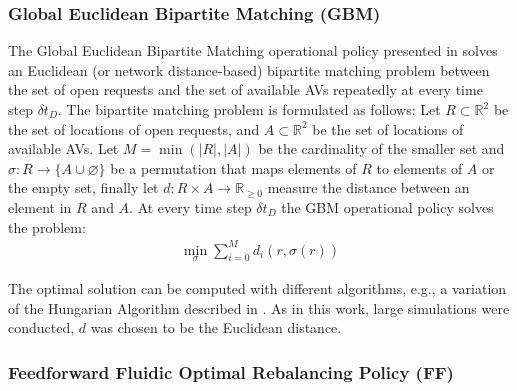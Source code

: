 \subsubsection{Global Euclidean Bipartite Matching (GBM)}

The Global Euclidean Bipartite Matching operational policy presented in \citep{amodeusBase} solves an  Euclidean (or network distance-based) bipartite matching problem between the set of open requests and the set of available AVs repeatedly at every time step $\delta t_D$. The bipartite matching problem is formulated as follows: Let $R\subset \mathbb{R}^2 $ be the set of locations of open requests, and $A\subset \mathbb{R}^2 $ be the set of locations of available AVs. Let $M=\min(|R|,|A|)$ be the cardinality of the smaller set and $\sigma: R \to \{A \cup \varnothing \}$ be a permutation that maps elements of $R$ to elements of $A$ or the empty set, finally let $d: R \times A \to \mathbb{R}_{\geq 0}$ measure the distance between an element in $R$ and $A$. At every time step $\delta t_D$ the GBM operational policy solves the problem:
\begin{align}
    \min_{\sigma} \sum_{i=0}^{M} d_i\left(r, \sigma(r)\right)
\end{align}

The optimal solution can be computed with different algorithms, e.g., a variation of the Hungarian Algorithm described in \citep[for instance]{agarwal2004near}. As in this work, large simulations were conducted, $d$ was chosen to be the Euclidean distance.

%

\subsubsection{Feedforward Fluidic Optimal Rebalancing Policy (FF)}

